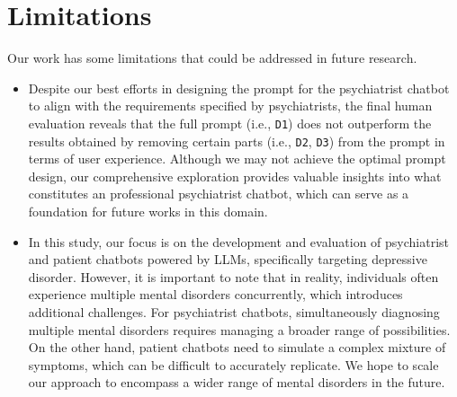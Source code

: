 \section{Limitations}
\label{sec:limitation}

Our work has some limitations that could be addressed in future research. 

\begin{itemize}
    \item Despite our best efforts in designing the prompt for the psychiatrist chatbot to align with the requirements specified by psychiatrists, the final human evaluation reveals that the full prompt (i.e., \texttt{D1}) does not outperform the results obtained by removing certain parts (i.e., \texttt{D2}, \texttt{D3}) from the prompt in terms of user experience. Although we may not achieve the optimal prompt design, our comprehensive exploration provides valuable insights into what constitutes an professional psychiatrist chatbot, which can serve as a foundation for future works in this domain.
   \item In this study, our focus is on the development and evaluation of psychiatrist and patient chatbots powered by LLMs, specifically targeting depressive disorder. However, it is important to note that in reality, individuals often experience multiple mental disorders concurrently, which introduces additional challenges. For psychiatrist chatbots, simultaneously diagnosing multiple mental disorders requires managing a broader range of possibilities. On the other hand, patient chatbots need to simulate a complex mixture of symptoms, which can be difficult to accurately replicate. We hope to scale our approach to encompass a wider range of mental disorders in the future.
\end{itemize}